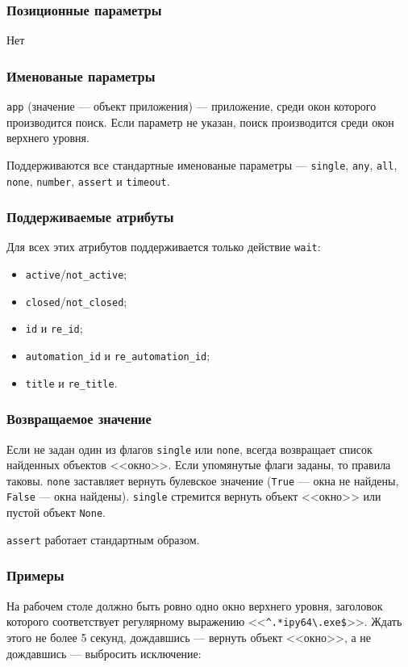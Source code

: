 \documentclass[11pt]{book} %
\begin{document}
\subsubsection*{Позиционные параметры}

Нет

\subsubsection*{Именованые параметры} 
\verb"app" (значение --- объект приложения) --- приложение, среди окон которого производится поиск. Если параметр не указан, поиск производится среди окон верхнего уровня.

Поддерживаются все стандартные именованые параметры --- \verb"single", \verb|any|, \verb|all|, \verb|none|, \verb|number|, \verb"assert" и \verb"timeout".


\subsubsection*{Поддерживаемые атрибуты} 

Для всех этих атрибутов поддерживается только действие \verb|wait|:

\begin{itemize}
\item \verb"active"/\verb"not_active";
\item \verb"closed"/\verb"not_closed";
\item \verb"id" и \verb"re_id";
\item \verb"automation_id" и \verb"re_automation_id";
\item \verb"title" и \verb"re_title".
\end{itemize}

\subsubsection*{Возвращаемое значение}
Если не задан один из флагов \verb"single" или \verb"none", всегда возвращает список найденных объектов <<окно>>. Если упомянутые флаги заданы, то правила таковы. \verb"none" заставляет вернуть булевское значение (\verb"True" --- окна не найдены, \verb"False" --- окна найдены). \verb"single" стремится вернуть объект <<окно>> или пустой объект \verb"None".

\verb"assert" работает стандартным образом.


\subsubsection*{Примеры}
На рабочем столе должно быть ровно одно окно верхнего уровня, заголовок которого соответствует регулярному выражению <<\verb"^.*ipy64\.exe$">>. Ждать этого не более 5 секунд, дождавшись --- вернуть объект <<окно>>, а не дождавшись --- выбросить исключение:
\end{document}

